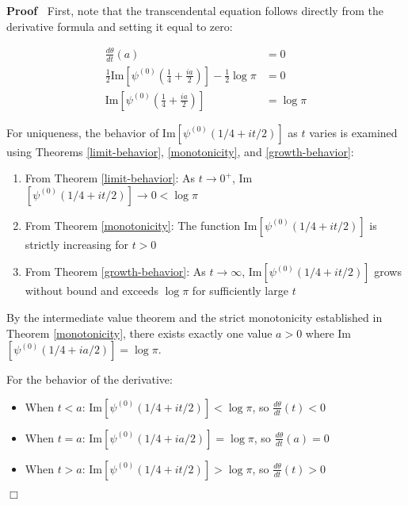 \documentclass{article}
\newenvironment{proof}{\noindent\textbf{Proof\ }}{\hspace*{\fill}$\Box$\medskip}
\begin{document}
\begin{proof}
  First, note that the transcendental equation follows directly from the
  derivative formula and setting it equal to zero:
  
  \begin{align}
    \frac{d \theta}{dt} (a) & = 0 \\
    \frac{1}{2}  \text{Im} \left[ \psi^{(0)}  \left( \frac{1}{4} +
    \frac{ia}{2} \right) \right] - \frac{1}{2} \log \pi & = 0 \\
    \text{Im} \left[ \psi^{(0)}  \left( \frac{1}{4} + \frac{ia}{2} \right)
    \right] & = \log \pi 
  \end{align}
  
  For uniqueness, the behavior of Im$[\psi^{(0)} (1 / 4 + it / 2)]$ as $t$
  varies is examined using Theorems \ref{limit-behavior}, \ref{monotonicity},
  and \ref{growth-behavior}:
  \begin{enumerate}
    \item From Theorem \ref{limit-behavior}: As $t \to 0^+$, Im$[\psi^{(0)} (1
    / 4 + it / 2)] \to 0 < \log \pi$
    
    \item From Theorem \ref{monotonicity}: The function Im$[\psi^{(0)} (1 / 4
    + it / 2)]$ is strictly increasing for $t > 0$
    
    \item From Theorem \ref{growth-behavior}: As $t \to \infty$,
    Im$[\psi^{(0)} (1 / 4 + it / 2)]$ grows without bound and exceeds $\log
    \pi$ for sufficiently large $t$
  \end{enumerate}
  By the intermediate value theorem and the strict monotonicity established in
  Theorem \ref{monotonicity}, there exists exactly one value $a > 0$ where
  Im$[\psi^{(0)} (1 / 4 + ia / 2)] = \log \pi$.
  
  For the behavior of the derivative:
  \begin{itemize}
    \item When $t < a$: Im$[\psi^{(0)} (1 / 4 + it / 2)] < \log \pi$, so
    $\frac{d \theta}{dt} (t) < 0$
    
    \item When $t = a$: Im$[\psi^{(0)} (1 / 4 + ia / 2)] = \log \pi$, so
    $\frac{d \theta}{dt} (a) = 0$
    
    \item When $t > a$: Im$[\psi^{(0)} (1 / 4 + it / 2)] > \log \pi$, so
    $\frac{d \theta}{dt} (t) > 0$
  \end{itemize}
\end{proof}
\end{document}
